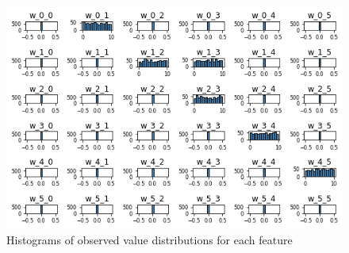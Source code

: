 

    \graphicspath{{resource/img/ch_ml/results/}}
    \begin{figure}
        \centering
  
            \includegraphics[width=.9\linewidth]{output_51_0.png}     
    
            \caption{Histograms of observed value distributions for each feature}%
    \label{fig:example}%
\end{figure}     




